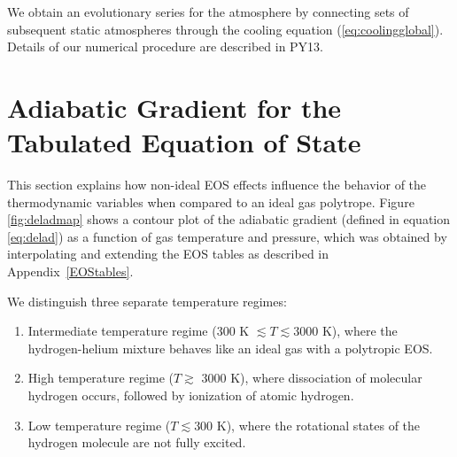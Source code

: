 \documentclass[apj]{emulateapj}
\newcommand{\delad}{\nabla_{\rm ad}}
\newcommand{\App}[1]{Appendix~\ref{#1}}
\begin{document}

We obtain an evolutionary series for the atmosphere by connecting sets of subsequent static atmospheres through the cooling equation (\ref{eq:coolingglobal}). Details of our numerical procedure are described in PY13.


\section{Adiabatic Gradient for the Tabulated Equation of State}
\label{deladtable}



This section explains how non-ideal EOS effects influence the behavior of the thermodynamic variables when compared to an ideal gas polytrope. Figure \ref{fig:deladmap} shows a contour plot of the adiabatic gradient (defined in equation \ref{eq:delad})  as a function of gas temperature and pressure, which was obtained by interpolating and extending the \citet{saumon95} EOS tables as described in \App{EOStables}.

We distinguish three separate temperature regimes:



\begin{enumerate}
\item Intermediate temperature regime (300 K $\lesssim T \lesssim 3000$ K), where the hydrogen-helium mixture behaves like an ideal gas with a polytropic EOS.
\item High temperature regime ($T \gtrsim$ 3000 K), where dissociation of molecular hydrogen occurs, followed by ionization of atomic hydrogen.
\item Low temperature regime ($T \lesssim 300$ K), where the rotational states of the hydrogen molecule are not fully excited. %
\end{enumerate}
\end{document}
